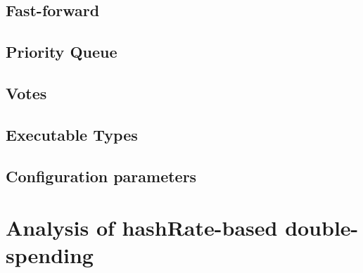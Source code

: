 \subsection{Fast-forward}
\subsection{Priority Queue}
\subsection{Votes}
\subsection{Executable Types}
\subsection{Configuration parameters}

\section{Analysis of hashRate-based double-spending}
